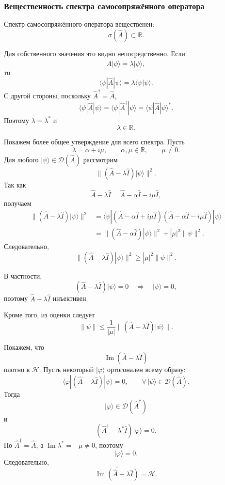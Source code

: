 \documentclass[12pt,a4paper]{article}
\begin{document}
\subsubsection{Вещественность спектра самосопряжённого оператора}

Спектр самосопряжённого оператора вещественен:
\[
    \boxed{
        \sigma(\hat A)\subset\mathbb R
    }.
\]

Для собственного значения это видно непосредственно. Если
\[
    \hat A|\psi\rangle
    =
    \lambda|\psi\rangle,
\]
то
\[
    \langle\psi|\hat A|\psi\rangle
    =
    \lambda\langle\psi|\psi\rangle.
\]
С другой стороны, поскольку $\hat A^\dagger=\hat A$,
\[
    \langle\psi|\hat A|\psi\rangle
    =
    \langle\psi|\hat A^\dagger|\psi\rangle
    =
    \langle\psi|\hat A|\psi\rangle^*.
\]
Поэтому $\lambda=\lambda^*$ и
\[
    \lambda\in\mathbb R.
\]

Покажем более общее утверждение для всего спектра. Пусть
\[
    \lambda=\alpha+i\mu,
    \qquad
    \alpha,\mu\in\mathbb R,
    \qquad
    \mu\neq0.
\]
Для любого $|\psi\rangle\in\mathcal D(\hat A)$ рассмотрим
\[
    \|(\hat A-\lambda\hat I)|\psi\rangle\|^2.
\]
Так как
\[
    \hat A-\lambda\hat I
    =
    \hat A-\alpha\hat I-i\mu\hat I,
\]
получаем
\begin{align*}
    \|(\hat A-\lambda\hat I)|\psi\rangle\|^2
    &=
    \langle\psi|
    (\hat A-\alpha\hat I+i\mu\hat I)
    (\hat A-\alpha\hat I-i\mu\hat I)
    |\psi\rangle \\
    &=
    \|(\hat A-\alpha\hat I)|\psi\rangle\|^2
    +
    |\mu|^2\|\psi\|^2.
\end{align*}
Следовательно,
\[
    \boxed{
    \|(\hat A-\lambda\hat I)|\psi\rangle\|^2
    \geq
    |\mu|^2\|\psi\|^2
    }.
\]

В частности,
\[
    (\hat A-\lambda\hat I)|\psi\rangle=0
    \quad\Longrightarrow\quad
    |\psi\rangle=0,
\]
поэтому $\hat A-\lambda\hat I$ инъективен.

Кроме того, из оценки следует
\[
    \|\psi\|
    \leq
    \frac{1}{|\mu|}
    \|(\hat A-\lambda\hat I)|\psi\rangle\|.
\]

Покажем, что
\[
    \operatorname{Im}(\hat A-\lambda\hat I)
\]
плотно в $\mathcal H$. Пусть некоторый $|\varphi\rangle$ ортогонален
всему образу:
\[
    \langle\varphi|
    (\hat A-\lambda\hat I)
    |\psi\rangle
    =
    0,
    \qquad
    \forall\,|\psi\rangle\in\mathcal D(\hat A).
\]
Тогда
\[
    |\varphi\rangle\in\mathcal D(\hat A^\dagger)
\]
и
\[
    (\hat A^\dagger-\lambda^*\hat I)|\varphi\rangle=0.
\]
Но $\hat A^\dagger=\hat A$, а $\operatorname{Im}\lambda^*=-\mu\neq0$,
поэтому
\[
    |\varphi\rangle=0.
\]
Следовательно,
\[
    \overline{
        \operatorname{Im}(\hat A-\lambda\hat I)
    }
    =
    \mathcal H.
\]
\end{document}
